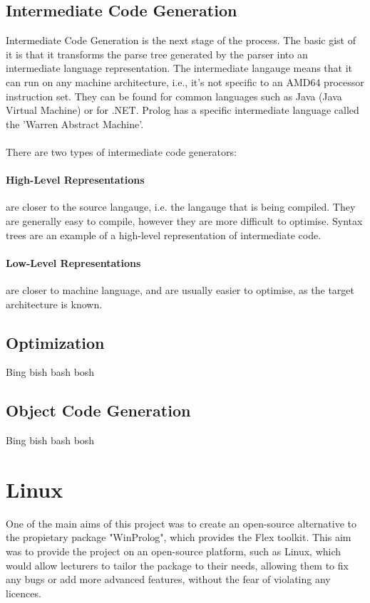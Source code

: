 \documentclass[12pt]{report}
\begin{document}
\subsection{Intermediate Code Generation}\label{subsec:intermediate_code_gen}
Intermediate Code Generation is the next stage of the process.  The basic gist of it is that it transforms the parse tree generated by the parser into an intermediate language representation.  The intermediate langauge means that it can run on any machine architecture, i.e., it's not specific to an AMD64 processor instruction set.  They can be found for common languages such as Java (Java Virtual Machine) or for .NET.  Prolog has a specific intermediate language called the 'Warren Abstract Machine'.\\
\\
There are two types of intermediate code generators:
\paragraph{High-Level Representations} are closer to the source langauge, i.e. the langauge that is being compiled.  They are generally easy to compile, however they are more difficult to optimise.  Syntax trees are an example of a high-level representation of intermediate code.
\paragraph{Low-Level Representations} are closer to machine language, and are usually easier to optimise, as the target architecture is known.
\subsection{Optimization}\label{subsec:optimization}
Bing bish bash bosh
\subsection{Object Code Generation}\label{subsec:object_code_gen}
Bing bish bash bosh


\section{Linux}\label{sec:linux}
One of the main aims of this project was to create an open-source alternative to the propietary package "WinProlog", which provides the Flex toolkit.  This aim was to provide the project on an open-source platform, such as Linux, which would allow lecturers to tailor the package to their needs, allowing them to fix any bugs or add more advanced features, without the fear of violating any licences.\\
\\
\\
\end{document}
